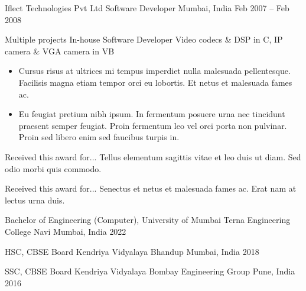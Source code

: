 \documentclass[10pt, a4paper]{cvhari}
\begin{document}
\smallskip
\divider
\smallskip

    \company
        {Iflect Technologies Pvt Ltd}
        {Software Developer}
        {Mumbai, India}
        {Feb 2007 – Feb 2008}
        
        \project
            {Multiple projects}
            {In-house}
            {Software Developer}
            {Video codecs \& DSP in C, IP camera \& VGA camera in VB}
    
            \begin{itemize}
                \item Cursus risus at ultrices mi tempus imperdiet nulla malesuada pellentesque. Facilisis magna etiam tempor orci eu lobortis. Et netus et malesuada fames ac. \smallskip
                \item Eu feugiat pretium nibh ipsum. In fermentum posuere urna nec tincidunt praesent semper feugiat. Proin fermentum leo vel orci porta non pulvinar. Proin sed libero enim sed faucibus turpis in.\smallskip
            \end{itemize}

\medskip

    \bigskip
    
    {Received this award for... Tellus elementum sagittis vitae et leo duis ut diam. Sed odio morbi quis commodo.}\par
    
    \smallskip 
    \dividergray
    \smallskip
    
    {Received this award for... Senectus et netus et malesuada fames ac. Erat nam at lectus urna duis.}\par
    \medskip

\medskip


\medskip
    \education
        {Bachelor of Engineering (Computer), University of Mumbai}
        {Terna Engineering College}
        {Navi Mumbai, India}
        {2022}
        \par
        \dividergray
     
        \education
        {HSC, CBSE Board}
        {Kendriya Vidyalaya Bhandup}
        {Mumbai, India}
        {2018}

        \par
        \dividergray

        \education
        {SSC, CBSE Board}
        {Kendriya Vidyalaya Bombay Engineering Group}
        {Pune, India}
        {2016}

        \par
        \dividergray
\end{document}
